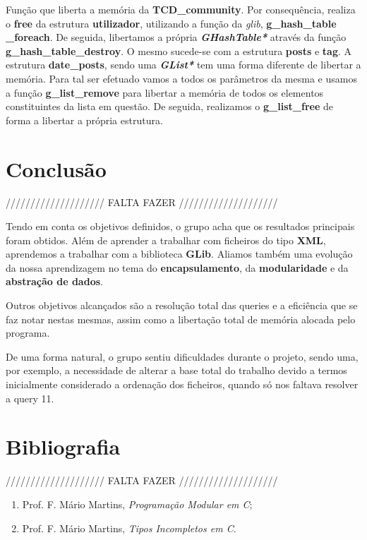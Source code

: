 \documentclass[a4paper]{article}
\begin{document}
Função que liberta a memória da \textbf{TCD\_community}. Por consequência,
realiza o \textbf{free} da estrutura \textbf{utilizador}, utilizando a 
função da \textit{glib}, \textbf{g\_hash\_table} \textbf{\_foreach}. 
De seguida, libertamos a própria \textit{\textbf{GHashTable*}} através da 
função \textbf{g\_hash\_table\_destroy}. O mesmo sucede-se com a estrutura
\textbf{posts} e \textbf{tag}. A estrutura \textbf{date\_posts}, sendo
uma \textit{\textbf{GList*}} tem uma forma diferente de libertar a 
memória. Para tal ser efetuado vamos a todos os parâmetros da mesma
e usamos a função \textbf{g\_list\_remove} para libertar a memória
de todos os elementos constituintes da lista em questão. De seguida,
realizamos o \textbf{g\_list\_free} de forma a libertar a própria 
estrutura.

\section{Conclusão}
\label{sec:conclusao}

//////////////////// FALTA FAZER ////////////////////

Tendo em conta os objetivos definidos, o grupo acha que os resultados 
principais foram obtidos. Além de aprender a trabalhar com ficheiros 
do tipo \textbf{XML}, aprendemos a trabalhar com a biblioteca \textbf{GLib}.
Aliamos também uma evolução da nossa aprendizagem no tema do 
\textbf{encapsulamento}, da \textbf{modularidade} e 
da \textbf{abstração de dados}.

Outros objetivos alcançados são a resolução total das queries e a eficiência
que se faz notar nestas mesmas, assim como a libertação total de memória 
alocada pelo programa.

De uma forma natural, o grupo sentiu dificuldades durante o projeto, sendo 
uma, por exemplo, a necessidade de alterar a base total do trabalho devido
a termos inicialmente considerado a ordenação dos ficheiros, quando só nos
faltava resolver a query 11.

\section{Bibliografia}

//////////////////// FALTA FAZER ////////////////////

\begin{enumerate} 
	\item Prof. F. Mário Martins, \textit{Programação Modular em C};
	\item Prof. F. Mário Martins, \textit{Tipos Incompletos em C}.
\end{enumerate}
\end{document}
